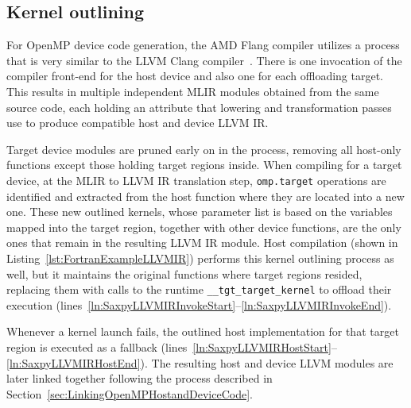 \documentclass[acmtog,natbib=false]{acmart}
\newcommand{\code}[1]{\texttt{#1}\xspace}
\begin{document}
\subsection{Kernel outlining}
\label{sec:KernelOutlining}

For OpenMP device code generation, the AMD Flang compiler utilizes a process that is very similar to the LLVM Clang compiler~\cite{antao2016offloading}.
There is one invocation of the compiler front-end for the host device and also one for each offloading target.
This results in multiple independent \ac{MLIR} modules obtained from the same source code, each holding an attribute that lowering and transformation passes use to produce compatible host and device LLVM \ac{IR}.

Target device modules are pruned early on in the process, removing all host-only functions except those holding target regions inside.
When compiling for a target device, at the \ac{MLIR} to LLVM \ac{IR} translation step, \code{omp.target} operations are identified and extracted from the host function where they are located into a new one.
These new outlined kernels, whose parameter list is based on the variables mapped into the target region, together with other device functions, are the only ones that remain in the resulting LLVM \ac{IR} module.
Host compilation (shown in Listing~\ref{lst:FortranExampleLLVMIR}) performs this kernel outlining process as well, but it maintains the original functions where target regions resided, replacing them with calls to the runtime \code{\_\_tgt\_target\_kernel} to offload their execution (lines~\ref{ln:SaxpyLLVMIRInvokeStart}--\ref{ln:SaxpyLLVMIRInvokeEnd}).

Whenever a kernel launch fails, the outlined host implementation for that target region is executed as a fallback (lines~\ref{ln:SaxpyLLVMIRHostStart}--\ref{ln:SaxpyLLVMIRHostEnd}).
The resulting host and device LLVM modules are later linked together following the process described in Section~\ref{sec:LinkingOpenMPHostandDeviceCode}.
 
\end{document}
